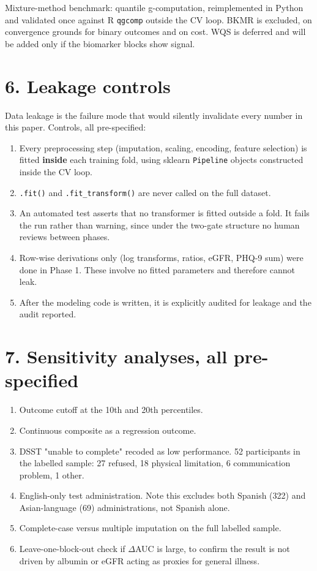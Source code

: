 \documentclass[11pt]{article}
\begin{document}
Mixture-method benchmark: quantile g-computation, reimplemented in Python and validated once against R \texttt{qgcomp} outside the CV loop. BKMR is excluded, on convergence grounds for binary outcomes and on cost. WQS is deferred and will be added only if the biomarker blocks show signal.

\section*{6. Leakage controls}

Data leakage is the failure mode that would silently invalidate every number in this paper. Controls, all pre-specified:

\begin{enumerate}[leftmargin=1.2cm]
\item Every preprocessing step (imputation, scaling, encoding, feature selection) is fitted \textbf{inside} each training fold, using sklearn \texttt{Pipeline} objects constructed inside the CV loop.
\item \texttt{.fit()} and \texttt{.fit\_transform()} are never called on the full dataset.
\item An automated test asserts that no transformer is fitted outside a fold. It fails the run rather than warning, since under the two-gate structure no human reviews between phases.
\item Row-wise derivations only (log transforms, ratios, eGFR, PHQ-9 sum) were done in Phase 1. These involve no fitted parameters and therefore cannot leak.
\item After the modeling code is written, it is explicitly audited for leakage and the audit reported.
\end{enumerate}

\section*{7. Sensitivity analyses, all pre-specified}

\begin{enumerate}[leftmargin=1.2cm]
\item Outcome cutoff at the 10th and 20th percentiles.
\item Continuous composite as a regression outcome.
\item DSST "unable to complete" recoded as low performance. 52 participants in the labelled sample: 27 refused, 18 physical limitation, 6 communication problem, 1 other.
\item English-only test administration. Note this excludes both Spanish (322) and Asian-language (69) administrations, not Spanish alone.
\item Complete-case versus multiple imputation on the full labelled sample.
\item Leave-one-block-out check if $\Delta$AUC is large, to confirm the result is not driven by albumin or eGFR acting as proxies for general illness.
\end{enumerate}
\end{document}
